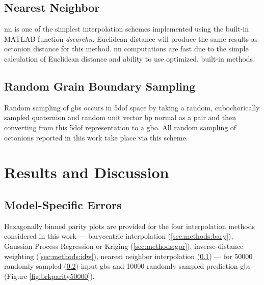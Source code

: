 \documentclass[preprint,12pt]{elsarticle}
\begin{document}
\subsection{Nearest Neighbor} \label{sec:methods:nn}

\Gls{nn} is one of the simplest interpolation schemes implemented using the built-in MATLAB function \textit{dsearchn}. Euclidean distance will produce the same results as octonion distance for this method. \Gls{nn} computations are fast due to the simple calculation of Euclidean distance and ability to use optimized, built-in methods.

\subsection{Random Grain Boundary Sampling} \label{sec:methods:rand}

Random sampling of \glspl{gb} occurs in \gls{5dof} space by taking a random, cubochorically sampled quaternion and random unit vector \gls{bp} normal as a pair and then converting from this \gls{5dof} representation to a \gls{gbo}. All random sampling of octonions reported in this work take place via this scheme.

    
        
    

\section{Results and Discussion} \label{sec:results}

\subsection{Model-Specific Errors} \label{sec:results:mdlerror}

Hexagonally binned parity plots \cite{beanHexscatter2020} are provided for the four interpolation methods considered in this work --- barycentric interpolation (\ref{sec:methods:bary}), Gaussian Process Regression or Kriging (\ref{sec:methods:gpr}), inverse-distance weighting (\ref{sec:methods:idw}), nearest neighbor interpolation (\ref{sec:methods:nn}) --- for \num{50000} randomly sampled (\ref{sec:methods:rand}) input \glspl{gb} and \num{10000} randomly sampled prediction \glspl{gb} (Figure \ref{fig:brkparity50000}).
\end{document}
